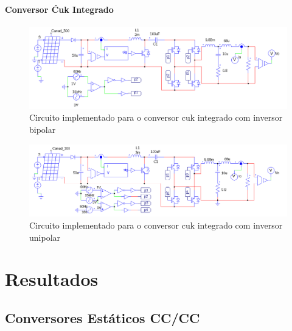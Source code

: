 \documentclass[
	12pt,				%
	openright,			%
	onseside,
	a4paper,			%
	english,			%
	french,				%
	spanish,			%
	brazil,				%
	]{abntex2}
\begin{document}
\subsubsection{Conversor Ćuk Integrado}
\begin{figure}[H]%
	\captionsetup{justification=centering}
	\centering
		\includegraphics[width=0.7 \linewidth]{comp_integ_circ_clean}
		\caption{Circuito implementado para o conversor cuk integrado com inversor bipolar}
		\label{fig:comp_integ_circ_clean}
\end{figure}
\begin{figure}[H]%
	\captionsetup{justification=centering}
	\centering
		\includegraphics[width=0.7 \linewidth]{comp_integ_circ_clean_unip}
		\caption{Circuito implementado para o conversor cuk integrado com inversor unipolar}
		\label{fig:comp_integ_circ_clean_unip}
\end{figure}

\chapter{Resultados}

\section{Conversores Estáticos CC/CC}
\end{document}
